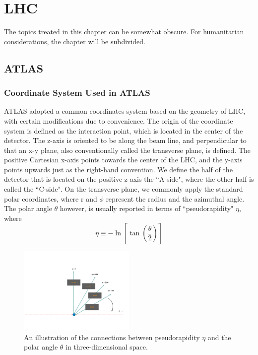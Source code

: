 \documentclass[final]{pittetd}%
\begin{document}
\chapter{LHC}
The topics treated in this chapter can be somewhat obscure. For humanitarian considerations, the chapter will be subdivided.
\section{ATLAS}
\subsection{Coordinate System Used in ATLAS}%
ATLAS adopted a common coordinates system based on the geometry of LHC, with certain modifications due to convenience. The origin of the coordinate system is defined as the interaction point, which is located in the center of the detector. The z-axis is oriented to be along the beam line, and perpendicular to that an x-y plane, also conventionally called the transverse plane, is defined. The positive Cartesian x-axis points towards the center of the LHC, and the y-axis points upwards just as the right-hand convention. We define the half of the detector that is located on the positive z-axis the ``A-side", where the other half is called the ``C-side". On the transverse plane, we commonly apply the standard polar coordinates, where r and $\phi$ represent the radius and the azimuthal angle. The polar angle $\theta$ however, is usually reported in terms of ``pseudorapidity" $\eta$, where 
\begin{equation}
\eta \equiv -\ln[\tan(\frac{\theta}{2})]
\end{equation}


\begin{figure}
  \centering
    \includegraphics[width=0.5\textwidth]{./images/etaFig}
  \caption{An illustration of the connections between pseudorapidity $\eta$ and the polar angle $\theta$ in three-dimensional space.}
\end{figure}
\end{document}
